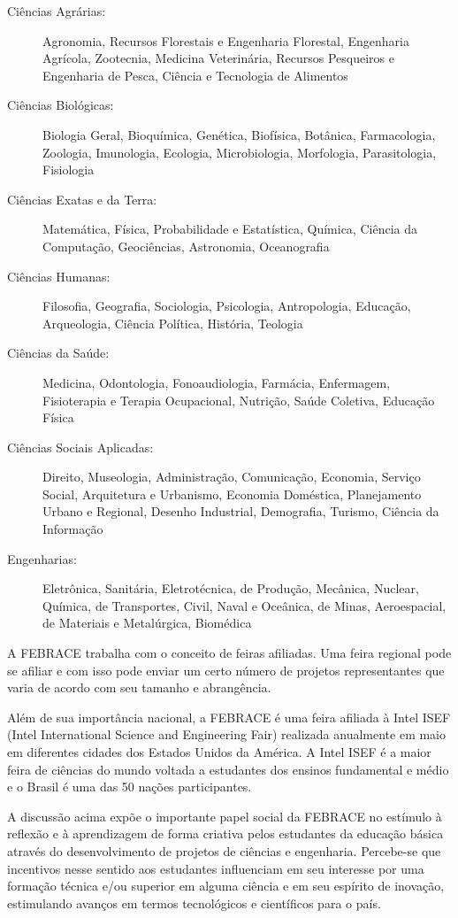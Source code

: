\begin{description}
    \item[Ciências Agrárias:] 
        Agronomia, Recursos Florestais e Engenharia Florestal, Engenharia Agrícola, Zootecnia, Medicina Veterinária, Recursos Pesqueiros e Engenharia de Pesca, Ciência e Tecnologia de Alimentos
    \item[Ciências Biológicas:] 
        Biologia Geral, Bioquímica, Genética, Biofísica, Botânica, Farmacologia, Zoologia, Imunologia, Ecologia, Microbiologia, Morfologia, Parasitologia, Fisiologia 	 
    \item[Ciências Exatas e da Terra:] 
        Matemática, Física, Probabilidade e Estatística, Química, Ciência da Computação, Geociências, Astronomia, Oceanografia 
    \item[Ciências Humanas:] 
        Filosofia, Geografia, Sociologia, Psicologia, Antropologia, Educação, Arqueologia, Ciência Política, História, Teologia 
    \item[Ciências da Saúde:] 
        Medicina, Odontologia, Fonoaudiologia, Farmácia, Enfermagem, Fisioterapia e Terapia Ocupacional, Nutrição, Saúde Coletiva, Educação Física
    \item[Ciências Sociais Aplicadas:] 
        Direito, Museologia, Administração, Comunicação, Economia, Serviço Social, Arquitetura e Urbanismo, Economia Doméstica, Planejamento Urbano e Regional, Desenho Industrial, Demografia, Turismo, Ciência da Informação  	 
    \item[Engenharias:] 
        Eletrônica, Sanitária, Eletrotécnica, de Produção, Mecânica, Nuclear, Química, de Transportes, Civil, Naval e Oceânica, de Minas, Aeroespacial, de Materiais e Metalúrgica, Biomédica 
\end{description}

A FEBRACE trabalha com o conceito de feiras afiliadas. Uma feira regional pode se afiliar e com isso pode enviar um certo número de projetos representantes que varia de acordo com seu tamanho e abrangência.

Além de sua importância nacional, a FEBRACE é uma feira afiliada à Intel ISEF (Intel International Science and Engineering Fair) realizada anualmente em maio em diferentes cidades dos Estados Unidos da América. A Intel ISEF é a maior feira de ciências do mundo voltada a estudantes dos ensinos fundamental e médio e o Brasil é uma das 50 nações participantes.

A discussão acima expõe o importante papel social da FEBRACE no estímulo à reflexão e à aprendizagem de forma criativa pelos estudantes da educação básica através do desenvolvimento de projetos de ciências e engenharia. Percebe-se que incentivos nesse sentido aos estudantes influenciam em seu interesse por uma formação técnica e/ou superior em alguma ciência e em seu espírito de inovação, estimulando avanços em termos tecnológicos e científicos para o país.

